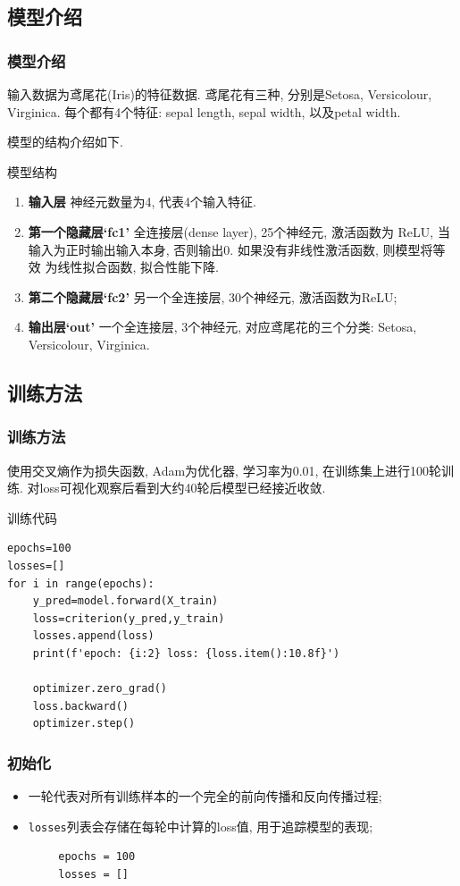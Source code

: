\documentclass{beamer}
\begin{document}
\subsection{模型介绍}
\begin{frame}
	\frametitle{模型介绍}

	输入数据为鸢尾花(Iris)的特征数据. 鸢尾花有三种, 分别是Setosa, Versicolour,
	Virginica. 每个都有4个特征: sepal length, sepal width, 以及petal width.

	模型的结构介绍如下.
	\begin{block}{模型结构}
		\begin{enumerate}
			\item \textbf{输入层} 神经元数量为4, 代表4个输入特征.
			\item \textbf{第一个隐藏层`fc1'} 全连接层(dense layer), 25个神经元, 激活函数为
			      ReLU, 当输入为正时输出输入本身, 否则输出0. 如果没有非线性激活函数, 则模型将等效
			      为线性拟合函数, 拟合性能下降.
			\item \textbf{第二个隐藏层`fc2'} 另一个全连接层, 30个神经元, 激活函数为ReLU;
			\item \textbf{输出层`out'} 一个全连接层, 3个神经元, 对应鸢尾花的三个分类:
			      Setosa, Versicolour, Virginica.
		\end{enumerate}
	\end{block}

\end{frame}

\subsection{训练方法}
\begin{frame}[fragile]
	\frametitle{训练方法}
	使用交叉熵作为损失函数, Adam为优化器, 学习率为0.01, 在训练集上进行100轮训练. 对loss可视化观察后看到大约40轮后模型已经接近收敛.
	\begin{block}{训练代码}
		\begin{verbatim}
epochs=100
losses=[]
for i in range(epochs):
    y_pred=model.forward(X_train)
    loss=criterion(y_pred,y_train)
    losses.append(loss)
    print(f'epoch: {i:2} loss: {loss.item():10.8f}')
    
    optimizer.zero_grad()
    loss.backward()
    optimizer.step()
	\end{verbatim}
	\end{block}
\end{frame}

\begin{frame}[fragile]
	\frametitle{初始化}
	\begin{itemize}
		\item 一轮代表对所有训练样本的一个完全的前向传播和反向传播过程;
		\item \texttt{losses}列表会存储在每轮中计算的loss值, 用于追踪模型的表现;
	\end{itemize}
	\begin{verbatim}
		epochs = 100
		losses = []
		\end{verbatim}
\end{frame}
\end{document}
